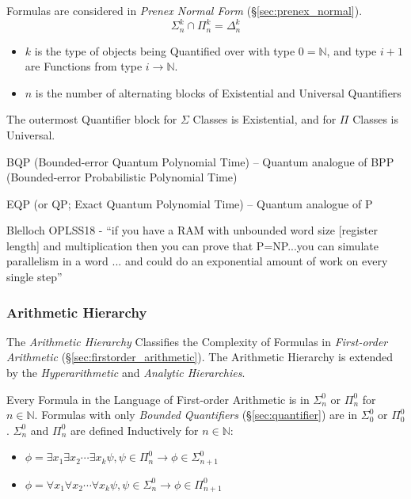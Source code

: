 Formulas are considered in \emph{Prenex Normal Form}
(\S\ref{sec:prenex_normal}).
\[
  \Sigma^k_n \cap \Pi^k_n = \Delta^k_n
\]
\begin{itemize}
  \item $k$ is the type of objects being Quantified over with type
    $0 = \mathbb{N}$, and type $i + 1$ are Functions from type $i
    \rightarrow \mathbb{N}$.
  \item $n$ is the number of alternating blocks of Existential and
    Universal Quantifiers
\end{itemize}
The outermost Quantifier block for $\Sigma$ Classes is Existential,
and for $\Pi$ Classes is Universal.

BQP (Bounded-error Quantum Polynomial Time) -- Quantum analogue of
BPP (Bounded-error Probabilistic Polynomial Time)

EQP (or QP; Exact Quantum Polynomial Time) -- Quantum analogue of P

Blelloch OPLSS18 - ``if you have a RAM with unbounded word size [register
  length] and multiplication then you can prove that P=NP...you can simulate
parallelism in a word ... and could do an exponential amount of work on every
single step''



\subsubsection{Arithmetic Hierarchy}\label{sec:arithmetic_hierarchy}

The \emph{Arithmetic Hierarchy} Classifies the Complexity of Formulas
in \emph{First-order Arithmetic}
(\S\ref{sec:firstorder_arithmetic}). The Arithmetic Hierarchy is
extended by the \emph{Hyperarithmetic} and \emph{Analytic
  Hierarchies}.

Every Formula in the Language of First-order Arithmetic is in
$\Sigma^0_n$ or $\Pi^0_n$ for $n \in \mathbb{N}$. Formulas with only
\emph{Bounded Quantifiers} (\S\ref{sec:quantifier}) are in
$\Sigma^0_0$ or $\Pi^0_0$. $\Sigma^0_n$ and $\Pi^0_n$ are defined
Inductively for $n \in \mathbb{N}$:

\begin{itemize}
  \item $\phi = \exists x_1 \exists x_2 \cdots \exists x_k\psi, \psi
    \in \Pi^0_n \rightarrow \phi \in \Sigma^0_{n+1}$
  \item $\phi = \forall x_1 \forall x_2 \cdots \forall x_k\psi, \psi
    \in \Sigma^0_n \rightarrow \phi \in \Pi^0_{n+1}$
\end{itemize}

